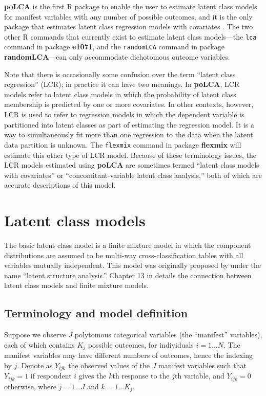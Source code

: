 \documentclass[letterpaper,12pt]{article}
\begin{document}
\textbf{poLCA} is the first \textsf{R} package to enable the user to estimate latent class models for manifest variables with any number of possible outcomes, and it is the only package that estimates latent class regression models with covariates \citep{poLCA, R}.  The two other \textsf{R} commands that currently exist to estimate latent class models---the \texttt{lca} command in package \textbf{e1071}, and the \texttt{randomLCA} command in package \textbf{randomLCA}---can only accommodate dichotomous outcome variables.

Note that there is occasionally some confusion over the term ``latent class regression'' (LCR); in practice it can have two meanings. In \textbf{poLCA}, LCR models refer to latent class models in which the probability of latent class membership is predicted by one or more covariates.  In other contexts, however, LCR is used to refer to regression models in which the dependent variable is partitioned into latent classes as part of estimating the regression model. It is a way to simultaneously fit more than one regression to the data when the latent data partition is unknown. The \texttt{flexmix} command in package \textbf{flexmix} will estimate this other type of LCR model. Because of these terminology issues, the LCR models estimated using \textbf{poLCA} are sometimes termed ``latent class models with covariates'' or ``concomitant-variable latent class analysis,'' both of which are accurate descriptions of this model.


\section{Latent class models}

The basic latent class model is a finite mixture model in which the component distributions are assumed to be multi-way cross-classification tables with all variables mutually independent. This model was originally proposed by \citet{Lazarsfeld1950} under the name ``latent structure analysis.'' Chapter 13 in \citet{Agresti2002} details the connection between latent class models and finite mixture models.

\subsection{Terminology and model definition}

Suppose we observe $J$ polytomous categorical variables (the ``manifest'' variables), each of which contains $K_j$ possible outcomes, for individuals $i=1...N$. The manifest variables may have different numbers of outcomes, hence the indexing by $j$. Denote as $Y_{ijk}$ the observed values of the $J$ manifest variables such that $Y_{ijk}=1$ if respondent $i$ gives the $k$th response to the $j$th variable, and $Y_{ijk}=0$ otherwise, where $j=1 \ldots J$ and $k=1 \ldots K_j$.
\end{document}
